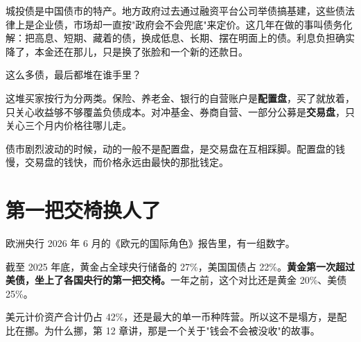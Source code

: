 城投债是中国债市的特产。地方政府过去通过融资平台公司举债搞基建，这些债法律上是企业债，市场却一直按"政府会不会兜底"来定价。这几年在做的事叫债务化解：把高息、短期、藏着的债，换成低息、长期、摆在明面上的债。利息负担确实降了，本金还在那儿，只是换了张脸和一个新的还款日。

这么多债，最后都堆在谁手里？

\begin{flowlist}
\end{flowlist}

这堆买家按行为分两类。保险、养老金、银行的自营账户是\textbf{配置盘}，买了就放着，只关心收益够不够覆盖负债成本。对冲基金、券商自营、一部分公募是\textbf{交易盘}，只关心三个月内价格往哪儿走。

债市剧烈波动的时候，动的一般不是配置盘，是交易盘在互相踩脚。配置盘的钱慢，交易盘的钱快，而价格永远由最快的那批钱定。

\section{第一把交椅换人了}

欧洲央行 2026 年 6 月的《欧元的国际角色》报告里，有一组数字。

\begin{barfig}
\end{barfig}

截至 2025 年底，黄金占全球央行储备的 27\%，美国国债占 22\%。\textbf{黄金第一次超过美债，坐上了各国央行的第一把交椅。}一年之前，这个对比还是黄金 20\%、美债 25\%。

美元计价资产合计仍占 42\%，还是最大的单一币种阵营。所以这不是塌方，是配比在挪。为什么挪，第 12 章讲，那是一个关于"钱会不会被没收"的故事。

